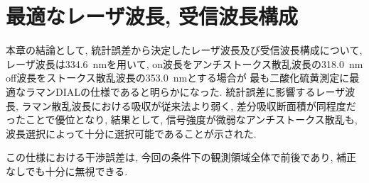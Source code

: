 \newpage
\section{最適なレーザ波長, 受信波長構成}
本章の結論として, 
統計誤差から決定したレーザ波長及び受信波長構成について, 
レーザ波長は\qty{334.6}{nm}を用いて, 
on波長をアンチストークス散乱波長の\qty{318.0}{nm} 
off波長をストークス散乱波長の\qty{353.0}{nm}とする場合が
最も二酸化硫黄測定に最適なラマンDIALの仕様であると明らかになった.  
統計誤差に影響するレーザ波長, ラマン散乱波長における吸収が従来法より弱く, 
差分吸収断面積が同程度だったことで優位となり, 
結果として, 信号強度が微弱なアンチストークス散乱も, 
波長選択によって十分に選択可能であることが示された. 

この仕様における干渉誤差は, 
今回の条件下の観測領域全体で前後であり, 
補正なしでも十分に無視できる.
